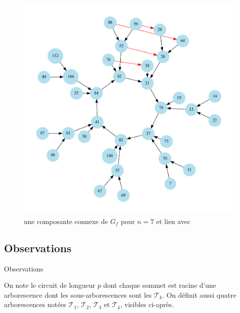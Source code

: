\begin{frame}
\begin{figure}
\includegraphics[scale=0.3]{./images/graph_7_3_1_mod}
\caption{une composante connexe de $G_f$ pour $n=7$ et lien avec \color{red}{$\phi=D$}}
\end{figure}
\end{frame}

\subsection{Observations}
\begin{frame}{Observations}
\begin{dftn}
On note  le circuit de longueur $p$ dont chaque sommet est racine d'une arborescence dont les sous-arborescences sont les $\mathcal{T}_k$. On d\'efinit aussi quatre arborescences not\'ees $\mathcal{T}_1$, $\mathcal{T}_2$, $\mathcal{T}_3$ et $\mathcal{T}_4$, visibles ci-apr\`es.
\end{dftn}
\end{frame}

